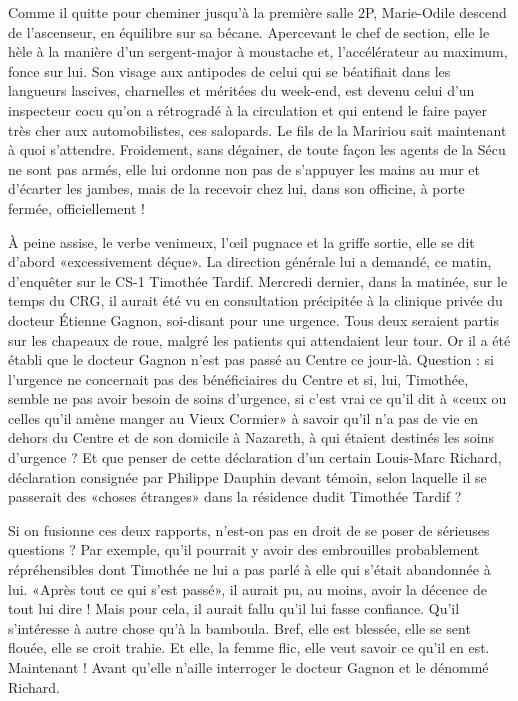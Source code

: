 Comme il quitte pour cheminer jusqu’à la première salle 2P, Marie-Odile descend de l’ascenseur, en équilibre sur sa bécane. Apercevant le chef de section, elle le hèle à la manière d’un sergent-major à moustache et, l’accélérateur au maximum, fonce sur lui. Son visage aux antipodes de celui qui se béatifiait dans les langueurs lascives, charnelles et méritées du week-end, est devenu celui d’un inspecteur cocu qu’on a rétrogradé à la circulation et qui entend le faire payer très cher aux automobilistes, ces salopards. Le fils de la Maririou sait maintenant à quoi s’attendre. Froidement, sans dégainer, de toute façon les agents de la Sécu ne sont pas armés, elle lui ordonne non pas de s’appuyer les mains au mur et d’écarter les jambes, mais de la recevoir chez lui, dans son officine, à porte fermée, officiellement !

À peine assise, le verbe venimeux, l’œil pugnace et la griffe sortie, elle se dit d’abord «excessivement déçue». La direction générale lui a demandé, ce matin, d’enquêter sur le CS-1 Timothée Tardif. Mercredi dernier, dans la matinée, sur le temps du CRG, il aurait été vu en consultation précipitée à la clinique privée du docteur Étienne Gagnon, soi-disant pour une urgence. Tous deux seraient partis sur les chapeaux de roue, malgré les patients qui attendaient leur tour. Or il a été établi que le docteur Gagnon n’est pas passé au Centre ce jour-là. Question : si l’urgence ne concernait pas des bénéficiaires du Centre et si, lui, Timothée, semble ne pas avoir besoin de soins d’urgence, si c’est vrai ce qu’il dit à «ceux ou celles qu’il amène manger au Vieux Cormier» à savoir qu’il n’a pas de vie en dehors du Centre et de son domicile à Nazareth, à qui étaient destinés les soins d’urgence ? Et que penser de cette déclaration d’un certain Louis-Marc Richard, déclaration consignée par Philippe Dauphin devant témoin, selon laquelle il se passerait des «choses étranges» dans la résidence dudit Timothée Tardif ?

Si on fusionne ces deux rapports, n’est-on pas en droit de se poser de sérieuses questions ? Par exemple, qu’il pourrait y avoir des embrouilles probablement répréhensibles dont Timothée ne lui a pas parlé à elle qui s’était abandonnée à lui. «Après tout ce qui s’est passé», il aurait pu, au moins, avoir la décence de tout lui dire ! Mais pour cela, il aurait fallu qu’il lui fasse confiance. Qu’il s’intéresse à autre chose qu’à la bamboula. Bref, elle est blessée, elle se sent flouée, elle se croit trahie. Et elle, la femme flic, elle veut savoir ce qu’il en est. Maintenant ! Avant qu’elle n’aille interroger le docteur Gagnon et le dénommé Richard.

